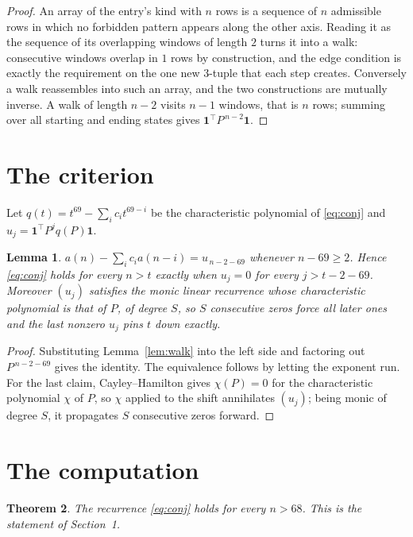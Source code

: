 \documentclass[11pt,a4paper]{article}
\theoremstyle{plain}
\newtheorem{theorem}{Theorem}
\newtheorem{lemma}[theorem]{Lemma}
\theoremstyle{definition}
\begin{document}
\begin{proof}
An array of the entry's kind with $n$ rows is a sequence of $n$ admissible rows in
which no forbidden pattern appears along the other axis. Reading it as the sequence of its
overlapping windows of length $2$ turns it into a walk: consecutive windows overlap in
$1$ rows by construction, and the edge condition is exactly the requirement on the one
new $3$-tuple that each step creates. Conversely a walk reassembles into such an array,
and the two constructions are mutually inverse. A walk of length $n-2$ visits $n-1$
windows, that is $n$ rows; summing over all starting and ending states gives
$\mathbf{1}^{\!\top}P^{\,n-2}\mathbf{1}$.
\end{proof}

\section{The criterion}

Let $q(t)=t^{69}-\sum_i c_i t^{69-i}$ be the characteristic polynomial of
\eqref{eq:conj} and $u_j=\mathbf{1}^{\!\top}P^{j}q(P)\mathbf{1}$.

\begin{lemma}\label{lem:crit}
$a(n)-\sum_i c_i a(n-i)=u_{\,n-2-69}$ whenever $n-69\ge2$. Hence
\eqref{eq:conj} holds for every $n>t$ exactly when $u_j=0$ for every
$j>t-2-69$. Moreover $(u_j)$ satisfies the monic linear recurrence whose
characteristic polynomial is that of $P$, of degree $S$, so $S$ consecutive zeros force all
later ones and the last nonzero $u_j$ pins $t$ down exactly.
\end{lemma}

\begin{proof}
Substituting Lemma~\ref{lem:walk} into the left side and factoring out
$P^{\,n-2-69}$ gives the identity. The equivalence follows by letting the exponent
run. For the last claim, Cayley--Hamilton gives $\chi(P)=0$ for the characteristic
polynomial $\chi$ of $P$, so $\chi$ applied to the shift annihilates $(u_j)$; being monic of
degree $S$, it propagates $S$ consecutive zeros forward.
\end{proof}

\section{The computation}

\begin{theorem}
The recurrence \eqref{eq:conj} holds for every $n>68$. This is the statement of
Section~1.
\end{theorem}
\end{document}
